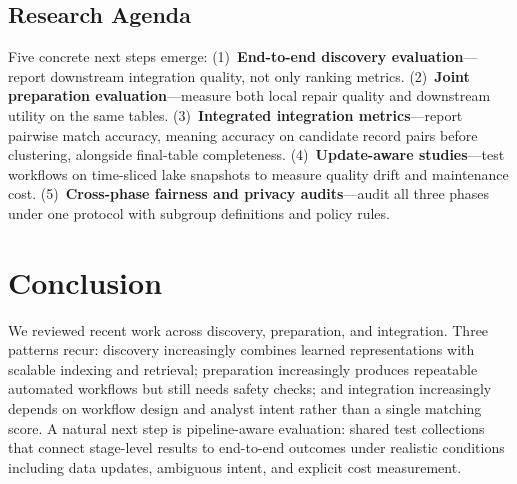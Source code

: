 \documentclass[sigconf]{acmart}
\begin{document}
\subsection{Research Agenda}
Five concrete next steps emerge:
(1)~\textbf{End-to-end discovery evaluation}---report downstream integration quality, not only ranking metrics.
(2)~\textbf{Joint preparation evaluation}---measure both local repair quality and downstream utility on the same tables.
(3)~\textbf{Integrated integration metrics}---report pairwise match accuracy, meaning accuracy on candidate record pairs before clustering, alongside final-table completeness.
(4)~\textbf{Update-aware studies}---test workflows on time-sliced lake snapshots to measure quality drift and maintenance cost.
(5)~\textbf{Cross-phase fairness and privacy audits}---audit all three phases under one protocol with subgroup definitions and policy rules.

\section{Conclusion}
We reviewed recent work across discovery, preparation, and integration. Three patterns recur: discovery increasingly combines learned representations with scalable indexing and retrieval; preparation increasingly produces repeatable automated workflows but still needs safety checks; and integration increasingly depends on workflow design and analyst intent rather than a single matching score. A natural next step is pipeline-aware evaluation: shared test collections that connect stage-level results to end-to-end outcomes under realistic conditions including data updates, ambiguous intent, and explicit cost measurement.


\balance


\end{document}
